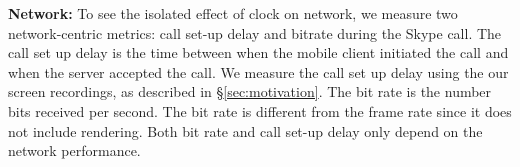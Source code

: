 

\noindent \textbf{Network:} 
To see the isolated effect of clock on network, we measure two network-centric metrics: call set-up delay and bitrate during the Skype call. 
The call set up delay is the time between when the mobile client initiated the call and when the server accepted the call. We measure the call set up delay using the our screen recordings, as described in \S\ref{sec:motivation}. The bit rate is the number bits received per second. The bit rate is different from the frame rate since it does not include rendering. Both bit rate and call set-up delay only depend on the network performance.

